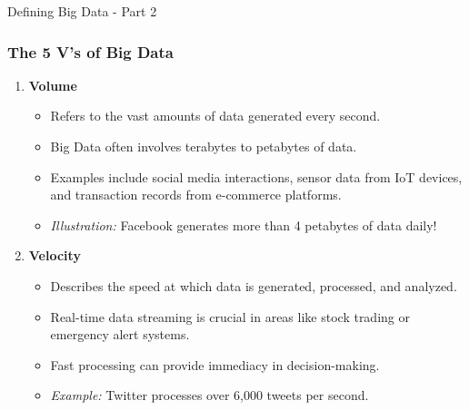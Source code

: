 \documentclass[aspectratio=169]{beamer}
\begin{document}
\begin{frame}[fragile]{Defining Big Data - Part 2}
    \frametitle{The 5 V's of Big Data}
    
    \begin{enumerate}
        \item \textbf{Volume}
            \begin{itemize}
                \item Refers to the vast amounts of data generated every second.
                \item Big Data often involves terabytes to petabytes of data.
                \item Examples include social media interactions, sensor data from IoT devices, and transaction records from e-commerce platforms.
                \item \textit{Illustration:} Facebook generates more than 4 petabytes of data daily!
            \end{itemize}
        
        \item \textbf{Velocity}
            \begin{itemize}
                \item Describes the speed at which data is generated, processed, and analyzed.
                \item Real-time data streaming is crucial in areas like stock trading or emergency alert systems.
                \item Fast processing can provide immediacy in decision-making.
                \item \textit{Example:} Twitter processes over 6,000 tweets per second.
            \end{itemize}
    \end{enumerate}
\end{frame}
\end{document}
